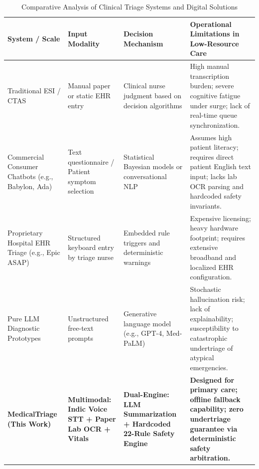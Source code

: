 \documentclass[11pt,a4paper,oneside]{report}
\begin{document}
\begin{table}[htbp]
  \centering
  \small
  \caption{Comparative Analysis of Clinical Triage Systems and Digital Solutions}
  \label{tab:lit_comparison}
  \begin{tabularx}{\textwidth}{p{2.6cm}p{2.6cm}p{2.8cm}X}
    \toprule
    \textbf{System / Scale} & \textbf{Input Modality} & \textbf{Decision Mechanism} & \textbf{Operational Limitations in Low-Resource Care} \\
    \midrule
    Traditional ESI / CTAS & Manual paper or static EHR entry & Clinical nurse judgment based on decision algorithms & High manual transcription burden; severe cognitive fatigue under surge; lack of real-time queue synchronization. \\
    \addlinespace
    Commercial Consumer Chatbots (e.g., Babylon, Ada) & Text questionnaire / Patient symptom selection & Statistical Bayesian models or conversational NLP & Assumes high patient literacy; requires direct patient English text input; lacks lab OCR parsing and hardcoded safety invariants. \\
    \addlinespace
    Proprietary Hospital EHR Triage (e.g., Epic ASAP) & Structured keyboard entry by triage nurse & Embedded rule triggers and deterministic warnings & Expensive licensing; heavy hardware footprint; requires extensive broadband and localized EHR configuration. \\
    \addlinespace
    Pure LLM Diagnostic Prototypes & Unstructured free-text prompts & Generative language model (e.g., GPT-4, Med-PaLM) & Stochastic hallucination risk; lack of explainability; susceptibility to catastrophic undertriage of atypical emergencies. \\
    \addlinespace
    \textbf{MedicalTriage (This Work)} & \textbf{Multimodal: Indic Voice STT + Paper Lab OCR + Vitals} & \textbf{Dual-Engine: LLM Summarization + Hardcoded 22-Rule Safety Engine} & \textbf{Designed for primary care; offline fallback capability; zero undertriage guarantee via deterministic safety arbitration.} \\
    \bottomrule
  \end{tabularx}
\end{table}
\end{document}
